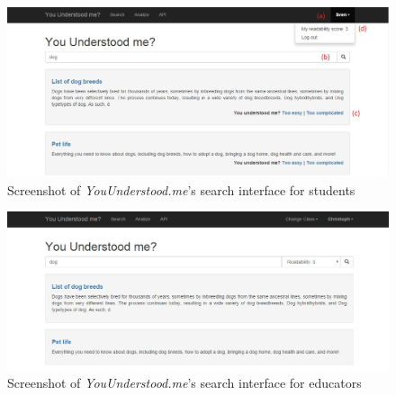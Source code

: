 \documentclass{sig-alternate-05-2015}
\begin{document}



%
%

%
%
\printccsdesc




\begin{figure}[ht]
 \centering
  \includegraphics[width=1\textwidth]{creatingFigures/Capture20}
 \caption{Screenshot of \textit{YouUnderstood.me}'s search interface for students}
 \label{fig:studentSearch}
 \end{figure}



\begin{figure}[ht]
 \centering
  \includegraphics[width=1\textwidth]{creatingFigures/Capture18}
 \caption{Screenshot of \textit{YouUnderstood.me}'s search interface for educators}
  \label{fig:educatorSearch}
 \end{figure}
\end{document}
